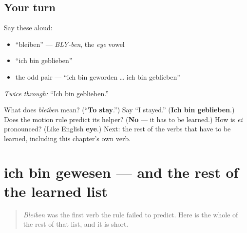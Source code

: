 \subsection*{Your turn}
Say these aloud:

\begin{itemize}
\raggedright
  \item \textquotedblleft{}bleiben\textquotedblright{} — \emph{BLY-ben}, the \emph{eye} vowel
  \item \textquotedblleft{}ich bin geblieben\textquotedblright{}
  \item the odd pair — \textquotedblleft{}ich bin geworden … ich bin geblieben\textquotedblright{}
\end{itemize}

\emph{Twice through:} \textquotedblleft{}Ich bin geblieben.\textquotedblright{}

\begin{tcolorbox}[breakable,colback=teal!4,colframe=teal!35!black,title={Before you move on}]
What does \emph{bleiben} mean? (\textquotedblleft{}\textbf{To stay}.\textquotedblright{}) Say \textquotedblleft{}I stayed.\textquotedblright{} (\textbf{Ich bin geblieben}.) Does the motion rule predict its helper? (\textbf{No} — it has to be learned.) How is \emph{ei} pronounced? (Like English \textbf{eye}.) Next: the rest of the verbs that have to be learned, including this chapter's own verb.
\end{tcolorbox}
\section[ich bin gewesen]{ich bin gewesen — and the rest of the learned list}

\label{lesson:GE-C16-perfekt-sein-ausnahmen}



\begin{quote}
\emph{Bleiben} was the first verb the rule failed to predict. Here is the whole of the rest of that list, and it is short.
\end{quote}

